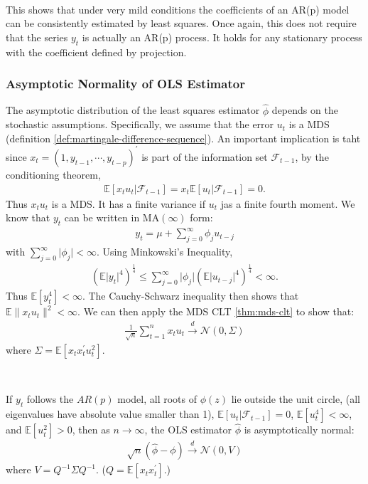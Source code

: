 \begin{note}
    \

    This shows that under very mild conditions the coefficients of an AR(p) model can be consistently estimated by least squares.
    Once again, this does not require that the series $y_t$ is actually an AR(p) process.
    It holds for any stationary process with the coefficient defined by projection.
\end{note}

\subsubsection{Asymptotic Normality of OLS Estimator}\label{sec:asymptotic-AR-OLS}

The asymptotic distribution of the least squares estimator $\hat{\phi}$ depends on the stochastic assumptions.
Specifically, we assume that the error $u_t$ is a MDS (definition \ref{def:martingale-difference-sequence}).
An important implication is taht since $x_t = \left( 1, y_{t-1}, \cdots, y_{t-p} \right)^{\prime} $ is part of the information set $\mathcal{F}_{t-1}$, by the conditioning theorem,
\begin{gather*}
    \mathbb{E}[x_t u_t | \mathcal{F}_{t-1}] = x_t \mathbb{E}[u_t | \mathcal{F}_{t-1}] = 0.
\end{gather*}
Thus $x_t u_t$ is a MDS. It has a finite variance if $u_t$ jas a finite fourth moment.
We know that $y_t$ can be written in MA$(\infty)$ form:
\begin{gather*}
    y_t = \mu + \sum_{j=0}^{\infty} \phi_j u_{t-j} 
\end{gather*}
with $\sum_{j=0}^{\infty} \vert \phi_j \vert < \infty$.
Using Minkowski's Inequality,
\begin{gather*}
    \left( \mathbb{E} \vert y_t \vert^4 \right)^\frac{1}{4} \leq \sum_{j=0}^{\infty} \vert \phi_j \vert \left( \mathbb{E} \vert u_{t-j} \vert^4 \right)^\frac{1}{4} < \infty.
\end{gather*}
Thus $\mathbb{E}[y_t^4] < \infty $. The Cauchy-Schwarz inequality then shows that $\mathbb{E} \lVert x_t u_t \rVert^2 < \infty.$
We can then apply the MDS CLT \ref{thm:mds-clt} to show that:
\begin{gather*}
    \frac{1}{\sqrt{n}} \sum_{t=1}^{n} x_t u_t \overset{d}{\rightarrow} \mathcal{N}(0, \Sigma)
\end{gather*}
where $\Sigma = \mathbb{E}[x_t x_t^{\prime} u_t^2].$
\begin{theorem}\label{thm:mds-ar-asymptotic-normality}
    \
    
    If $y_t$ follows the $AR(p)$ model, all roots of $\phi(z)$ lie outside the unit circle,
    (all eigenvalues have absolute value smaller than 1), $\mathbb{E}[u_t | \mathcal{F}_{t-1}] = 0$, $\mathbb{E}[u_t^4] < \infty$,
    and $\mathbb{E}[u_t^2] > 0$, then as $n \to \infty$, the OLS estimator $\hat{\phi}$ is asymptotically normal:
    \begin{gather*}
        \sqrt{n}\left( \hat{\phi} - \phi \right) \overset{d}{\rightarrow} \mathcal{N}(0, V)
    \end{gather*}
    where $V = Q^{-1} \Sigma Q^{-1}.$ ($Q = \mathbb{E}[x_t x_t^{\prime}].$)
\end{theorem}
